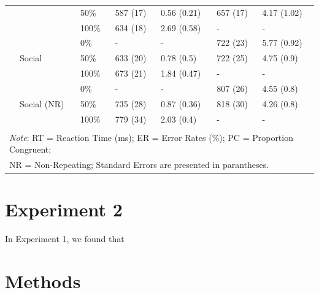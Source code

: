 \documentclass[english,,man,floatsintext]{apa6}
\begin{document}
\begin{table}[htbp]
\begin{tabular}{lllcccc}
& & \multicolumn{1}{l}{50\%} & \multicolumn{1}{l}{587 (17)} & \multicolumn{1}{l}{0.56 (0.21)} & \multicolumn{1}{l}{657 (17)} & \multicolumn{1}{l}{4.17 (1.02)} \\
& & \multicolumn{1}{l}{100\%} & \multicolumn{1}{l}{634 (18)} & \multicolumn{1}{l}{2.69 (0.58)} & \multicolumn{1}{l}{-} & \multicolumn{1}{l}{-} \\
\cmidrule(rl){2-7}
& \multirow{3}{*}{Social} & \multicolumn{1}{l}{0\%} & \multicolumn{1}{l}{-} & \multicolumn{1}{l}{-} & \multicolumn{1}{l}{722 (23)} & \multicolumn{1}{l}{5.77 (0.92)} \\
& & \multicolumn{1}{l}{50\%} & \multicolumn{1}{l}{633 (20)} & \multicolumn{1}{l}{0.78 (0.5)} & \multicolumn{1}{l}{722 (25)} & \multicolumn{1}{l}{4.75 (0.9)} \\
& & \multicolumn{1}{l}{100\%} & \multicolumn{1}{l}{673 (21)} & \multicolumn{1}{l}{1.84 (0.47)} & \multicolumn{1}{l}{-} & \multicolumn{1}{l}{-} \\
\cmidrule(rl){2-7}
& \multirow{3}{*}{Social (NR)} & \multicolumn{1}{l}{0\%} & \multicolumn{1}{l}{-} & \multicolumn{1}{l}{-} & \multicolumn{1}{l}{807 (26)} & \multicolumn{1}{l}{4.55 (0.8)} \\
& & \multicolumn{1}{l}{50\%} & \multicolumn{1}{l}{735 (28)} & \multicolumn{1}{l}{0.87 (0.36)} & \multicolumn{1}{l}{818 (30)} & \multicolumn{1}{l}{4.26 (0.8)} \\
& & \multicolumn{1}{l}{100\%} & \multicolumn{1}{l}{779 (34)} & \multicolumn{1}{l}{2.03 (0.4)} & \multicolumn{1}{l}{-} & \multicolumn{1}{l}{-} \\
 & & & & & & \\
\bottomrule
\multicolumn{7}{l}{\textit{Note}: RT = Reaction Time (ms);  ER = Error Rates (\%); PC = Proportion Congruent;} \\
\multicolumn{7}{l}{NR = Non-Repeating; Standard Errors are presented in parantheses.} \\
\end{tabular}%
\end{table}

\hypertarget{experiment-2}{%
\section{Experiment 2}\label{experiment-2}}

In Experiment 1, we found that

\hypertarget{methods-1}{%
\section{Methods}\label{methods-1}}
\end{document}
